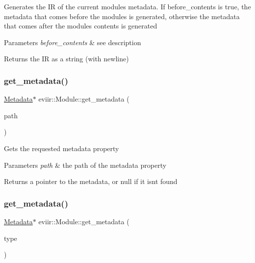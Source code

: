 Generates the IR of the current module\textquotesingle{}s metadata. If before\+\_\+contents is true, the metadata that comes before the module\textquotesingle{}s is generated, otherwise the metadata that comes after the module\textquotesingle{}s contents is generated 
\begin{DoxyParams}{Parameters}
{\em before\+\_\+contents} & see description \\
\hline
\end{DoxyParams}
\begin{DoxyReturn}{Returns}
the IR as a string (with newline) 
\end{DoxyReturn}
\mbox{\label{classeviir_1_1Module_a99eddf2af67228eff3d92ec073fa4941}} 
\subsubsection{\texorpdfstring{get\+\_\+metadata()}{get\_metadata()}\hspace{0.1cm}{\footnotesize\ttfamily [1/2]}}
{\footnotesize\ttfamily \hyperlink{classeviir_1_1Metadata}{Metadata}$\ast$ eviir\+::\+Module\+::get\+\_\+metadata (\begin{DoxyParamCaption}\item[{\hyperlink{classeviir_1_1Metadata_ac613e5de0552301f9b7969d14eb5dffa}{Metadata\+::path}}]{path }\end{DoxyParamCaption})}

Gets the requested metadata property 
\begin{DoxyParams}{Parameters}
{\em path} & the path of the metadata property \\
\hline
\end{DoxyParams}
\begin{DoxyReturn}{Returns}
a pointer to the metadata, or null if it isn\textquotesingle{}t found 
\end{DoxyReturn}
\mbox{\label{classeviir_1_1Module_a75d08de493ea90b6d41b3c53ad856012}} 
\subsubsection{\texorpdfstring{get\+\_\+metadata()}{get\_metadata()}\hspace{0.1cm}{\footnotesize\ttfamily [2/2]}}
{\footnotesize\ttfamily \hyperlink{classeviir_1_1Metadata}{Metadata}$\ast$ eviir\+::\+Module\+::get\+\_\+metadata (\begin{DoxyParamCaption}\item[{\hyperlink{classeviir_1_1Metadata_a372fe4af91ebc18a6d02354e8bcf23cf}{Metadata\+::builtin\+\_\+property\+\_\+type}}]{type }\end{DoxyParamCaption})}

